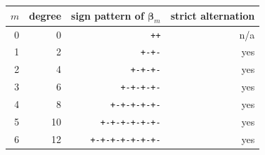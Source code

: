 \begin{tabular}{@{}rrrr@{}}
\toprule
$m$ & degree & sign pattern of $\boldsymbol\beta_m$ & strict alternation\\
\midrule
0 & 0 & \texttt{++} & n/a\\
1 & 2 & \texttt{+-+-} & yes\\
2 & 4 & \texttt{+-+-+-} & yes\\
3 & 6 & \texttt{+-+-+-+-} & yes\\
4 & 8 & \texttt{+-+-+-+-+-} & yes\\
5 & 10 & \texttt{+-+-+-+-+-+-} & yes\\
6 & 12 & \texttt{+-+-+-+-+-+-+-} & yes\\
\bottomrule
\end{tabular}

